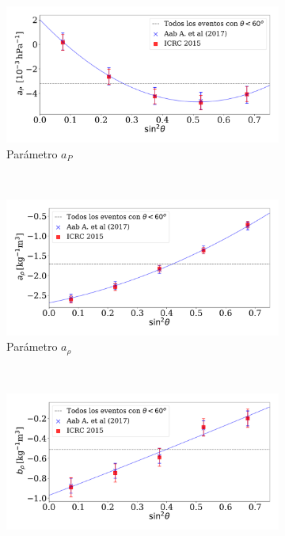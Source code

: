                 \begin{figure}[H]
                    \centering
                    \begin{subfigure}[b]{0.8\textwidth}
                    \includegraphics[width=\linewidth]{Graphs/params/ap_ICRC_2015_above_1EeV_v2.pdf}
                    \caption{Parámetro $a_P$ }
                    \label{fig:ap_2015}
                    \end{subfigure}\\
                    \begin{subfigure}[b]{0.8\textwidth}
                    \includegraphics[width=\linewidth]{Graphs/params/arho_ICRC_2015_above_1EeV_v2.pdf}
                    \caption{Parámetro $a_{\rho}$ }
                    \label{fig:arho_2015}
                    \end{subfigure}\\
                    \begin{subfigure}[b]{\textwidth}
                    \centering
                    \includegraphics[width=0.8\linewidth]{Graphs/params/brho_ICRC_2015_above_1EeV_v2.pdf}

\end{subfigure}
\end{figure}
